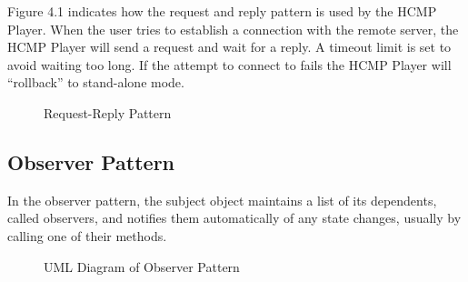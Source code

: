 Figure 4.1 indicates how the request and reply pattern is used by the HCMP Player. 
When the user tries to establish a connection with the remote server, the HCMP Player 
will send a request and wait for a reply. A timeout limit is set to 
avoid waiting too long. If the attempt to connect to fails the HCMP Player
will ``rollback'' to stand-alone mode.
\begin{figure}[H]
\caption{Request-Reply Pattern}
\end{figure}

\subsection{Observer Pattern}
In the observer pattern, the subject object maintains a list of its 
dependents, called observers, and notifies them automatically of 
any state changes, usually by calling one of their methods.
\begin{figure}[H]
\caption{UML Diagram of Observer Pattern}
\end{figure}

